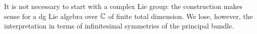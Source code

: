 \documentclass[10pt]{amsart}
\def\brian{\textcolor{blue}{BW: }\textcolor{blue}}
\def\owen{\textcolor{magenta}{OG: }\textcolor{magenta}}
\begin{document}
It is not necessary to start with a complex Lie group: 
the construction makes sense for a dg Lie algebra over $\mathbb C$ of finite total dimension.
We lose, however, the interpretation in terms of infinitesimal symmetries of the principal bundle.

%
%
%
%
\end{document}
